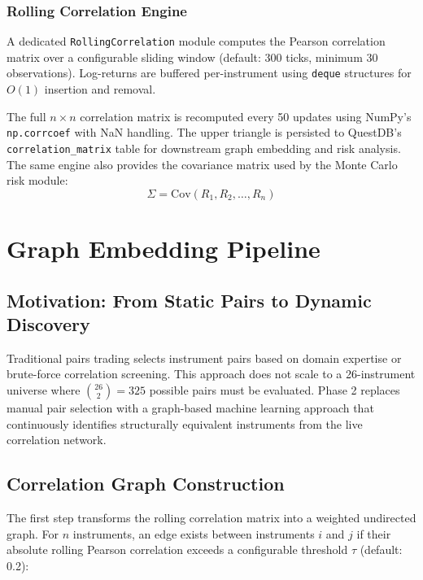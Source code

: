 \documentclass[letterpaper,11pt]{report}
\begin{document}
\subsection{Rolling Correlation Engine}

A dedicated \texttt{RollingCorrelation} module computes the Pearson correlation matrix over a configurable sliding window (default: 300 ticks, minimum 30 observations). Log-returns are buffered per-instrument using \texttt{deque} structures for $O(1)$ insertion and removal.

The full $n \times n$ correlation matrix is recomputed every 50 updates using NumPy's \texttt{np.corrcoef} with NaN handling. The upper triangle is persisted to QuestDB's \texttt{correlation\_matrix} table for downstream graph embedding and risk analysis. The same engine also provides the covariance matrix used by the Monte Carlo risk module:
$$\Sigma = \text{Cov}(R_1, R_2, \ldots, R_n)$$

\chapter{Graph Embedding Pipeline}

\section{Motivation: From Static Pairs to Dynamic Discovery}

Traditional pairs trading selects instrument pairs based on domain expertise or brute-force correlation screening. This approach does not scale to a 26-instrument universe where ${26 \choose 2} = 325$ possible pairs must be evaluated. Phase 2 replaces manual pair selection with a graph-based machine learning approach that continuously identifies structurally equivalent instruments from the live correlation network.

\section{Correlation Graph Construction}

The first step transforms the rolling correlation matrix into a weighted undirected graph. For $n$ instruments, an edge exists between instruments $i$ and $j$ if their absolute rolling Pearson correlation exceeds a configurable threshold $\tau$ (default: 0.2):
\end{document}
